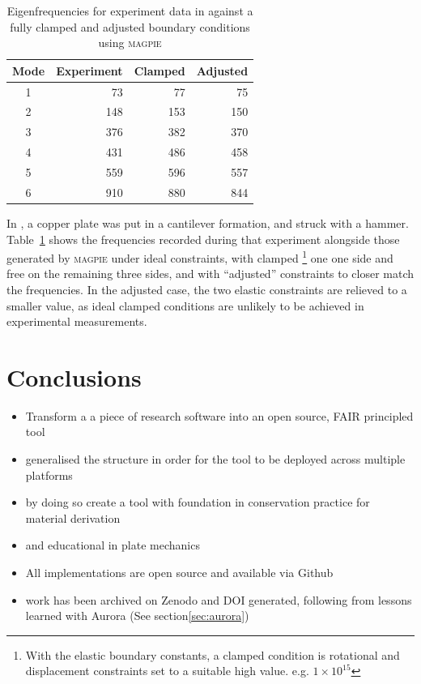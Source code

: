 \begin{table}
	\centering
	\begin{tabular}{c r r r}
		\toprule
		Mode              & \textbf{Experiment} & \textbf{Clamped} & \textbf{Adjusted} \\ \hline
		1     \chladniOne & 73                  & 77               & 75                \\
		2     \chladniTwo & 148                 & 153              & 150               \\
		3     \chladniThr & 376                 & 382              & 370               \\
		4     \chladniFou & 431                 & 486              & 458               \\
		5     \chladniFiv & 559                 & 596              & 557               \\
		6     \chladniSix & 910                 & 880              & 844               \\ \hline
	\end{tabular}
	\caption{Eigenfrequencies for experiment data in \cite{duran_experimentally_2023} against a fully clamped and adjusted boundary conditions using \textsc{magpie}}
	\label{tab:case-study}
\end{table}

In \textcite{duran_experimentally_2023}, a copper plate was put in a cantilever formation, and struck with a hammer. Table~\ref{tab:case-study} shows the frequencies recorded during that experiment alongside those generated by \textsc{magpie} under ideal constraints, with clamped
\footnote{With the elastic boundary constants, a clamped condition is rotational and displacement constraints set to a suitable high value. e.g. $1\times10^{15}$}
one one side and free on the remaining three sides,
and with ``adjusted'' constraints to closer match the frequencies. In the adjusted case, the two elastic constraints are relieved to a smaller value, as ideal clamped conditions are unlikely to be achieved in experimental measurements.


\section{Conclusions}\label{sec:Conclusions}

\begin{itemize}
    \item Transform a a piece of research software into an open source, FAIR principled tool
    \item generalised the structure in order for the tool to be deployed across multiple platforms
    \item by doing so create a tool with foundation in conservation practice for material derivation
    \item and educational in plate mechanics
    \item All implementations are open source and available via Github
    \item work has been archived on Zenodo and DOI generated, following from lessons learned with Aurora (See section\ref{sec:aurora})
\end{itemize}

